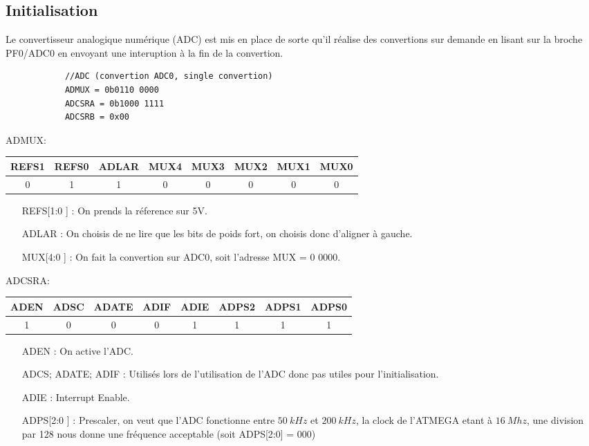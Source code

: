 \documentclass[a4paper, 12pt]{article}
\begin{document}
		\subsection{Initialisation}
		Le convertisseur analogique numérique (ADC) est mis en place de sorte qu'il réalise des convertions sur demande en lisant sur la broche PF0/ADC0 en envoyant une interuption à la fin de la convertion.
		\begin{lstlisting}
			//ADC (convertion ADC0, single convertion)
			ADMUX = 0b0110 0000
			ADCSRA = 0b1000 1111
			ADCSRB = 0x00
		\end{lstlisting}
		\newpage
		ADMUX:
		\begin{center}
		\begin{tabular}{|c|c|c|c|c|c|c|c|}
		\hline
		REFS1 & REFS0 & ADLAR & MUX4 & MUX3 & MUX2 & MUX1 & MUX0\\
		\hline
		0 & 1 & 1 & 0 & 0 & 0 & 0 & 0\\
		\hline
		\end{tabular}
		\end{center}
		\begin{itemize}
			\item[REFS[1:0]] : On prends la réference sur 5V.
			\item[ADLAR] : On choisis de ne lire que les bits de poids fort, on choisis donc d'aligner à gauche.
			\item[MUX[4:0]] : On fait la convertion sur ADC0, soit l'adresse MUX = 0 0000.
		\end{itemize}
		
		ADCSRA:
		\begin{center}
			\begin{tabular}{|c|c|c|c|c|c|c|c|}
				\hline
				ADEN & ADSC & ADATE & ADIF & ADIE & ADPS2 & ADPS1 & ADPS0\\
				\hline
				1 & 0 & 0 & 0 & 1 & 1 & 1 & 1\\
				\hline
			\end{tabular}
		\end{center}
		\begin{itemize}
			\item[ADEN] : On active l'ADC.
			\item[ADCS; ADATE; ADIF] : Utilisés lors de l'utilisation de l'ADC donc pas utiles pour l'initialisation.
			\item[ADIE] : Interrupt Enable.
			\item[ADPS[2:0]] : Prescaler, on veut que l'ADC fonctionne entre $50\ kHz$ et $200\ kHz$, la clock de l'ATMEGA etant à $16\ Mhz$, une division par 128 nous donne une fréquence acceptable (soit ADPS[2:0] = 000)
		\end{itemize}
		
\end{document}
